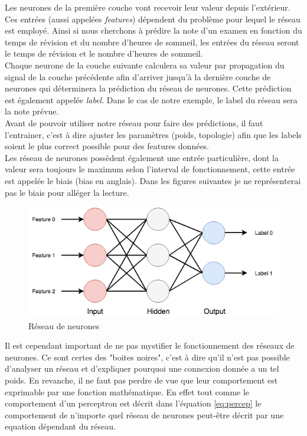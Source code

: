 \documentclass{article}
\begin{document}
Les neurones de la première couche vont recevoir leur valeur depuis l'extérieur. Ces entrées (aussi appelées \textit{features}) dépendent du problème pour lequel le réseau est employé. Ainsi si nous cherchons à prédire la note d'un examen en fonction du temps de révision et du nombre d'heures de sommeil, les entrées du réseau seront le temps de révision et le nombre d'heures de sommeil.\\
 Chaque neurone de la couche suivante calculera sa valeur par propagation du signal de la couche précédente afin d'arriver jusqu'à la dernière couche de neurones qui déterminera la prédiction du réseau de neurones. Cette prédiction est également appelée \textit{label}. Dans le cas de notre exemple, le label du réseau sera la note prévue.\\
 Avant de pouvoir utiliser notre réseau pour faire des prédictions, il faut l'entrainer, c'est à dire ajuster les paramètres (poids, topologie) afin que les labels soient le plus correct possible pour des features données.\\
 
 Les réseau de neurones possèdent également une entrée particulière, dont la valeur sera toujours le maximum selon l'interval de fonctionnement, cette entrée est appelée le biais (bias en anglais). Dans les figures suivantes je ne représenterai pas le biais pour alléger la lecture.
 
\begin{figure}[H]
\begin{center}
	\includegraphics[scale=0.7]{ff.png}
	\caption{Réseau de neurones}
\end{center}
\end{figure}
 
 Il est cependant important de ne pas mystifier le fonctionnement des réseaux de neurones. Ce sont certes des "boites noires", c'est à dire qu'il n'est pas possible d'analyser un réseau et d'expliquer pourquoi une connexion donnée a un tel poids. En revanche, il ne faut pas perdre de vue que leur comportement est exprimable par une fonction mathématique. En effet tout comme le comportement d'un perceptron est décrit dans l'équation \ref{eq:percep} le comportement de n'importe quel réseau de neurones peut-être décrit par une equation dépendant du réseau.
\end{document}
